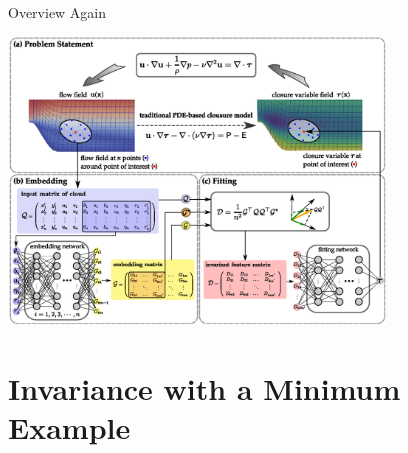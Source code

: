 \documentclass[presentation,aspectratio=169]{beamer}
\begin{document}
\begin{frame}[label={sec:orgb440440}]{Overview Again}
\begin{center}
\includegraphics[width=0.75\textwidth]{figs/NN-architecture.eps}
\end{center}
\end{frame}

\section{Invariance with a Minimum Example}
\label{sec:org1867efb}
\end{document}

